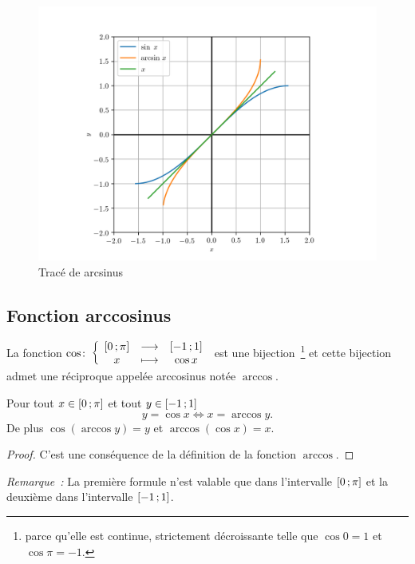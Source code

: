 \begin{figure}
  \centering
  \includegraphics[scale = 0.8]{arcsin.png}
  \caption{Tracé de arcsinus}
  \label{fig:tracearcsinus}
\end{figure}

\subsection{Fonction arccosinus}
\label{subsec:chap1-fonctionarccos}

\begin{defdef}
  La fonction 
  \(\cos\colon \left\{\begin{array}{ccc} \left[ 0 \, ;  \pi \right] & \longrightarrow &\left[ -1 \, ;  1 \right]\\ x & \longmapsto & \cos x \end{array} \right.\) 
  est une bijection~\footnote{parce qu'elle est continue, strictement 
  décroissante telle que \(\cos 0 = 1\) et \(\cos \pi = -1\).} et cette 
  bijection admet une réciproque appelée arccosinus notée \(\arccos\).
\end{defdef}

\begin{prop}
  Pour tout \(x \in \left[ 0 \, ;  \pi \right]\) et tout \(y \in 
  \left[ -1 \, ;  1 \right]\)
  \begin{equation}
    y = \cos x \iff x = \arccos y.
  \end{equation}
  De plus \(\cos( \arccos y) = y\) et \(\arccos(\cos x) = x\).
\end{prop}

\begin{proof}
  C'est une conséquence de la définition de la fonction \(\arccos\).
\end{proof}

\emph{Remarque~:} La première formule n'est valable que dans l'intervalle 
\(\left[ 0 \, ;  \pi \right]\) et la deuxième dans l'intervalle 
\(\left[ -1 \, ;  1 \right]\).

